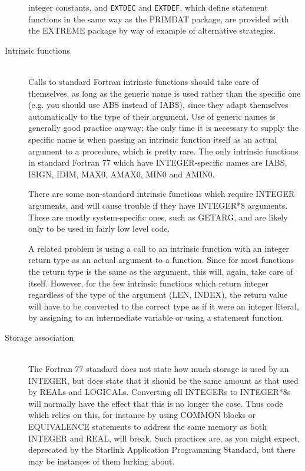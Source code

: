 \documentclass[twoside,11pt]{article}
\newcommand{\html}[1]{}
\newcommand{\xref}[3]{#1}
\renewcommand{\_}{\texttt{\symbol{95}}}
\newcommand{\file}[1]{{\tt #1}}
\newcommand{\ditem}[1]{\item[#1]\mbox{}\\}
\newenvironment{squote}{\begin{quote}\begin{small}}{\end{small}\end{quote}}
\begin{document}
\begin{description}
integer constants, and \file{EXT\_DEC} and \file{EXT\_DEF},
which define statement functions in the same way as the
\xref{PRIMDAT}{sun39}{} package, are provided with the EXTREME 
package by way of example of alternative strategies.
\html{\begin{squote}\end{squote}}
%
\ditem{Intrinsic functions}
Calls to standard Fortran intrinsic functions should take care of themselves,
as long as the generic name is used rather than the specific one
(e.g. you should use ABS instead of IABS),
since they adapt themselves automatically to the type of their argument.  
Use of generic names is generally good practice anyway;
the only time it is necessary to supply the specific name is 
when passing an intrinsic function itself as an actual argument
to a procedure, which is pretty rare.
The only intrinsic functions in standard Fortran 77 which have 
INTEGER-specific names are IABS, ISIGN, IDIM, MAX0, AMAX0, MIN0 and AMIN0.

There are some non-standard intrinsic functions which require INTEGER
arguments, and will cause trouble if they have INTEGER*8 arguments.
These are mostly system-specific ones, such as GETARG,
and are likely only to be used in fairly low level code.

A related problem is using a call to an intrinsic function with 
an integer return type as an actual argument to a function.
Since for most functions the return type is the same as the argument,
this will, again, take care of itself.  However, for the few
intrinsic functions which return integer regardless of the type of
the argument (LEN, INDEX), the return value will have to be converted to
the correct type as if it were an integer literal, 
by assigning to an intermediate variable or using a statement function.
\html{\begin{squote}\end{squote}}
%
\ditem{Storage association}
The Fortran 77 standard does not state how much storage is used by
an INTEGER, but does state that it should be the same amount as that
used by REALs and LOGICALs.
Converting all INTEGERs to INTEGER*8s will
normally have the effect that this is no longer the case.
Thus code which relies on this, for instance by using COMMON blocks or
EQUIVALENCE statements to address the same memory as both INTEGER and REAL,
will break.  
Such practices are, as you might expect, deprecated by the 
\xref{Starlink Application Programming Standard}{sgp16}{},
but there may be instances of them lurking about.


\end{description}
\end{document}
